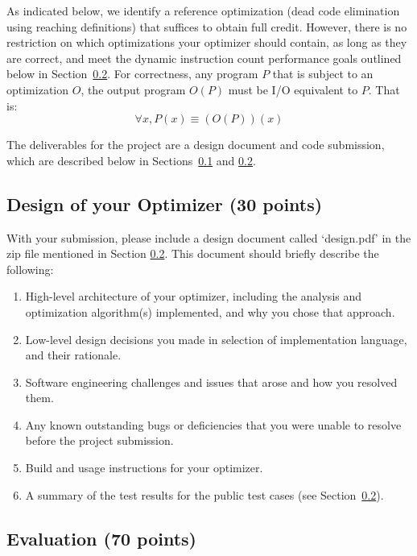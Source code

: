 \documentclass[12pt]{article}
\begin{document}
As indicated below, we identify a reference optimization (dead code
elimination using reaching definitions) that suffices to obtain full
credit.  However, there is no restriction on which optimizations your optimizer should
contain, as long as they are correct, and meet the dynamic instruction count
performance goals outlined below in Section~\ref{sec:test}. For correctness, any program $P$ that is subject to an optimization $O$, the output program $O(P)$ must be I/O equivalent to $P$. That is:
\[ \forall x, P(x) \equiv (O(P))(x) \]

The deliverables for the project are a design document and code
submission, which are described below in Sections~\ref{sec:opt} and \ref{sec:test}.

\subsection{Design of your Optimizer (30 points)}\label{sec:opt}

With your submission, please include a design document called
`design.pdf' in the zip file mentioned in Section \ref{sec:test}.
%
This document should briefly describe the following:
%
\begin{enumerate}
\item High-level architecture of your optimizer, including the
  analysis and optimization
  algorithm(s) implemented, and why you chose that approach.
\item Low-level design decisions you made in selection of
  implementation language, and their rationale.
\item Software engineering challenges and issues that arose and how
  you resolved them.
\item Any known outstanding bugs or deficiencies that you were unable
  to   resolve before the project submission.
       \item Build and usage instructions for your optimizer.
        \item A summary of the test results for the public test cases
          (see Section~\ref{sec:test}).
 \end{enumerate}
   
\subsection{Evaluation (70 points)}\label{sec:test}
\end{document}
